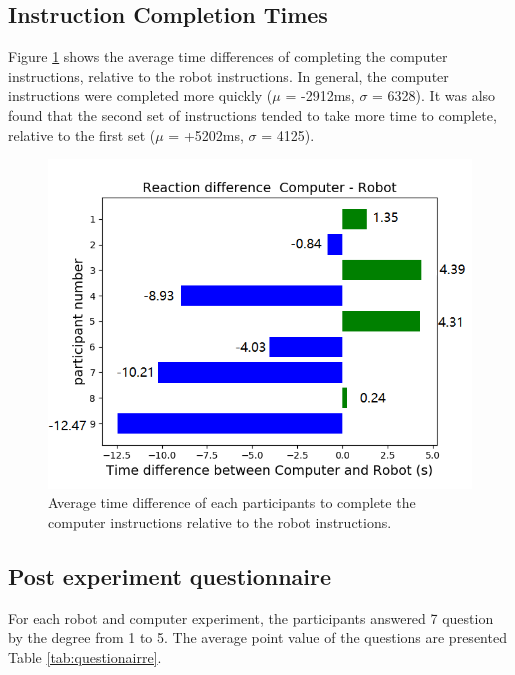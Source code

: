 \documentclass[conference]{IEEEtran}
\begin{document}
\subsection{Instruction Completion Times}

Figure \ref{fig:instruction_time_diff} shows the average time differences of completing the computer instructions, relative to the robot instructions. In general, the computer instructions were completed more quickly ($\mu$ = -2912ms, $\sigma$ = 6328). It was also found that the second set of instructions tended to take more time to complete, relative to the first set ($\mu$ = +5202ms, $\sigma$ = 4125).

\begin{figure}[h]
	\flushleft 
	\includegraphics[width=1\linewidth]{figures/difference.png}
	\caption{\label{fig:instruction_time_diff}Average time difference of each participants to complete the computer instructions relative to the robot instructions.}  
\end{figure}

\subsection{Post experiment questionnaire}
For each robot and computer experiment, the participants answered 7 question by the degree from 1 to 5. The average point value of the questions are presented Table \ref{tab:questionairre}.   
\end{document}
